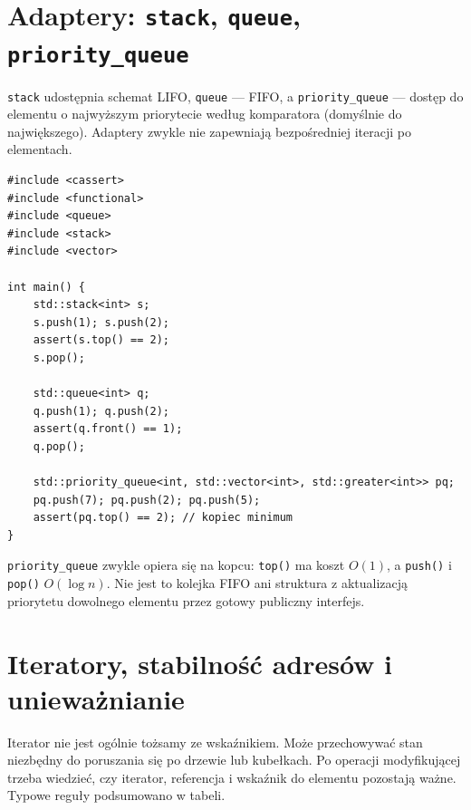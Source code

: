 \section{Adaptery: \texttt{stack}, \texttt{queue}, \texttt{priority\_queue}}
\label{sec:cpp13-adaptors}

\texttt{stack} udostępnia schemat LIFO, \texttt{queue} --- FIFO,
a \texttt{priority\_queue} --- dostęp do elementu o najwyższym
priorytecie według komparatora (domyślnie do największego).
Adaptery zwykle nie zapewniają bezpośredniej iteracji po elementach.

\begin{lstlisting}[caption={Trzy adaptery standardowe (C++11); kompletny program.}]
#include <cassert>
#include <functional>
#include <queue>
#include <stack>
#include <vector>

int main() {
    std::stack<int> s;
    s.push(1); s.push(2);
    assert(s.top() == 2);
    s.pop();

    std::queue<int> q;
    q.push(1); q.push(2);
    assert(q.front() == 1);
    q.pop();

    std::priority_queue<int, std::vector<int>, std::greater<int>> pq;
    pq.push(7); pq.push(2); pq.push(5);
    assert(pq.top() == 2); // kopiec minimum
}
\end{lstlisting}

\texttt{priority\_queue} zwykle opiera się na kopcu: \texttt{top()} ma
koszt $O(1)$, a \texttt{push()} i \texttt{pop()} $O(\log n)$. Nie jest
to kolejka FIFO ani struktura z aktualizacją priorytetu dowolnego elementu
przez gotowy publiczny interfejs.

\section{Iteratory, stabilność adresów i unieważnianie}
\label{sec:cpp13-invalidation}

Iterator nie jest ogólnie tożsamy ze wskaźnikiem. Może przechowywać
stan niezbędny do poruszania się po drzewie lub kubełkach. Po operacji
modyfikującej trzeba wiedzieć, czy iterator, referencja i wskaźnik do
elementu pozostają ważne. Typowe reguły podsumowano w tabeli.

